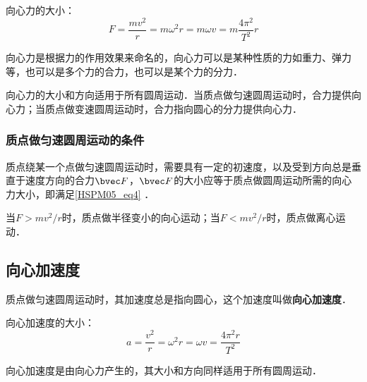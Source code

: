 向心力的大小：
\begin{equation}\label{HSPM05_eq4}
F=\frac{mv^2}{r}=m\omega^2r=m\omega v=m\frac{4\pi^2}{T^2}r
\end{equation}

向心力是根据力的作用效果来命名的，向心力可以是某种性质的力如重力、弹力等，也可以是多个力的合力，也可以是某个力的分力．

向心力的大小和方向适用于所有圆周运动．当质点做匀速圆周运动时，合力提供向心力；当质点做变速圆周运动时，合力指向圆心的分力提供向心力．

\subsubsection{质点做匀速圆周运动的条件}

质点绕某一个点做匀速圆周运动时，需要具有一定的初速度，以及受到方向总是垂直于速度方向的合力$\bvec F$，$\bvec F$的大小应等于质点做圆周运动所需的向心力大小，即满足\autoref{HSPM05_eq4} ．

当$F>mv^2/r$时，质点做半径变小的向心运动；当$F<mv^2/r$时，质点做离心运动．

\subsection{向心加速度}

质点做匀速圆周运动时，其加速度总是指向圆心，这个加速度叫做\textbf{向心加速度}．

向心加速度的大小：
\begin{equation}
a=\frac{v^2}{r}=\omega^2r=\omega v=\frac{4\pi^2r}{T^2}
\end{equation}

向心加速度是由向心力产生的，其大小和方向同样适用于所有圆周运动．
